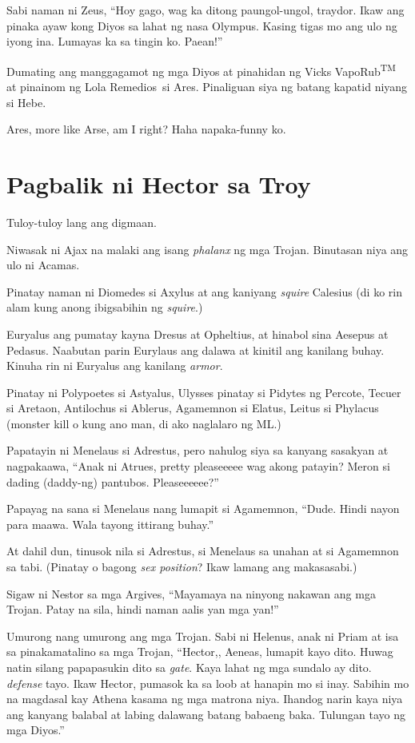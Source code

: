 \documentclass[12pt,letterpaper]{report}
\begin{document}
Sabi naman ni Zeus, ``Hoy gago, wag ka ditong paungol-ungol, traydor. Ikaw ang pinaka ayaw kong Diyos sa lahat ng nasa Olympus. Kasing tigas mo ang ulo ng iyong ina. Lumayas ka sa tingin ko. Paean!''

Dumating ang manggagamot ng mga Diyos at pinahidan ng Vicks VapoRub\textsuperscript{TM} at pinainom ng Lola Remedios\texttrademark\ si Ares. Pinaliguan siya ng batang kapatid niyang si Hebe.

Ares, more like Arse, am I right? Haha napaka-funny ko. \pagebreak
\chapter{Pagbalik ni Hector sa Troy}

Tuloy-tuloy lang ang digmaan.

Niwasak ni Ajax na malaki ang isang \textit{phalanx} ng mga Trojan. Binutasan niya ang ulo ni Acamas.

Pinatay naman ni Diomedes si Axylus at ang kaniyang \textit{squire} Calesius (di ko rin alam kung anong ibigsabihin ng \textit{squire}.)

Euryalus ang pumatay kayna Dresus at Opheltius, at hinabol sina Aesepus at Pedasus. Naabutan parin Eurylaus ang dalawa at kinitil ang kanilang buhay. Kinuha rin ni Euryalus ang kanilang \textit{armor}.

Pinatay ni Polypoetes si Astyalus, Ulysses pinatay si Pidytes ng Percote, Tecuer si Aretaon, Antilochus si Ablerus, Agamemnon si Elatus, Leitus si Phylacus (monster kill o kung ano man, di ako naglalaro ng ML.)

Papatayin ni Menelaus si Adrestus, pero nahulog siya sa kanyang sasakyan at nagpakaawa, ``Anak ni Atrues, pretty pleaseeeee wag akong patayin? Meron si dading (daddy-ng) pantubos. Pleaseeeeee?''

Papayag na sana si Menelaus nang lumapit si Agamemnon, ``Dude. Hindi nayon para maawa. Wala tayong ittirang buhay.''

At dahil dun, tinusok nila si Adrestus, si Menelaus sa unahan at si Agamemnon sa tabi. (Pinatay o bagong \textit{sex position}? Ikaw lamang ang makasasabi.)

Sigaw ni Nestor sa mga Argives, ``Mayamaya na ninyong nakawan ang mga Trojan. Patay na sila, hindi naman aalis yan mga yan!''

Umurong nang umurong ang mga Trojan. Sabi ni Helenus, anak ni Priam at isa sa pinakamatalino sa mga Trojan, ``Hector,, Aeneas, lumapit kayo dito. Huwag natin silang papapasukin dito sa \textit{gate}. Kaya lahat ng mga sundalo ay dito. \textit{defense} tayo. Ikaw Hector, pumasok ka sa loob at hanapin mo si inay. Sabihin mo na magdasal kay Athena kasama ng mga matrona niya. Ihandog narin kaya niya ang kanyang balabal at labing dalawang batang babaeng baka. Tulungan tayo ng mga Diyos.''
\end{document}
